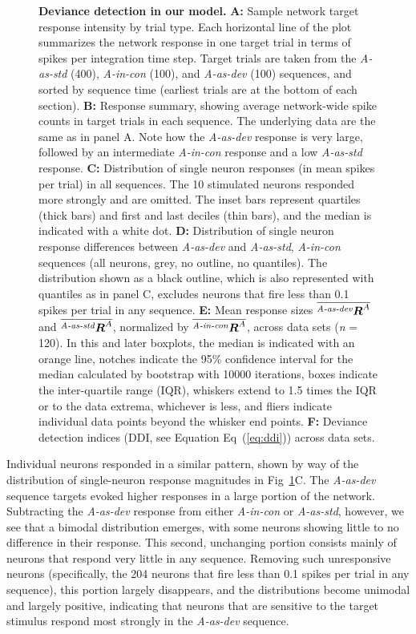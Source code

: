 \documentclass[10pt,letterpaper]{article}
\newcommand{\dev}{\textit{A-as-dev}}
\newcommand{\msc}{\textit{A-in-con}}
\newcommand{\std}{\textit{A-as-std}}
\newcommand{\ifstringequal}[4]{%
  \ifnum\pdfstrcmp{#1}{#2}=0
  #3%
  \else
  #4%
  \fi
}
\newcommand{\seqreplace}[1]{\ifstringequal{dev}{#1}{\dev}{%
    \ifstringequal{std}{#1}{\std}{%
        \ifstringequal{msc}{#1}{\msc}{#1}%
    }%
}}
\newcommand{\R}[3][]{{}^{\seqreplace{#1}}_{}\boldsymbol R^{#2}_{#3}}
\newcommand{\mean}[1]{\overline{#1}}
\newcommand{\FIG}[1]{Fig~\ref{fig:#1}}
\newcommand{\EQ}[1]{Eq~(\ref{eq:#1})}
\newcommand{\statistic}[2]{\textit{#1} = \num{#2}}
\begin{document}
\begin{figure}[!h]
    \caption{%
        \textbf{Deviance detection in our model.}
        \textbf{A:} Sample network target response intensity by trial type. Each horizontal line of the plot summarizes the network response in one target trial in terms of spikes per integration time step. Target trials are taken from the \std{} (400), \msc{} (100), and \dev{} (100) sequences, and sorted by sequence time (earliest trials are at the bottom of each section).
        \textbf{B:} Response summary, showing average network-wide spike counts in target trials in each sequence. The underlying data are the same as in panel A. Note how the \dev{} response is very large, followed by an intermediate \msc{} response and a low \std{} response.
        \textbf{C:} Distribution of single neuron responses (in mean spikes per trial) in all sequences. The 10 stimulated neurons responded more strongly and are omitted. The inset bars represent quartiles (thick bars) and first and last deciles (thin bars), and the median is indicated with a white dot.
        \textbf{D:} Distribution of single neuron response differences between \dev{} and \std{}, \msc{} sequences (all neurons, grey, no outline, no quantiles). The distribution shown as a black outline, which is also represented with quantiles as in panel C, excludes neurons that fire less than 0.1 spikes per trial in any sequence.
        \textbf{E:} Mean response sizes $\mean{\R[dev]{A}{}}$ and $\mean{\R[std]{A}{}}$, normalized by $\mean{\R[msc]{A}{}}$, across data sets (\statistic{n}{120}). In this and later boxplots, the median is indicated with an orange line, notches indicate the 95\% confidence interval for the median calculated by bootstrap with 10000 iterations, boxes indicate the inter-quartile range (IQR), whiskers extend to 1.5 times the IQR or to the data extrema, whichever is less, and fliers indicate individual data points beyond the whisker end points.
        \textbf{F:} Deviance detection indices (DDI, see Equation \EQ{ddi}) across data sets.
    }
    \label{fig:2}
\end{figure}

Individual neurons responded in a similar pattern, shown by way of the distribution of single-neuron response magnitudes in \FIG{2}C. The \dev{} sequence targets evoked higher responses in a large portion of the network. Subtracting the \dev{} response from either \msc{} or \std{}, however, we see that a bimodal distribution emerges, with some neurons showing little to no difference in their response. This second, unchanging portion consists mainly of neurons that respond very little in any sequence. Removing such unresponsive neurons (specifically, the 204 neurons that fire less than 0.1 spikes per trial in any sequence), this portion largely disappears, and the distributions become unimodal and largely positive, indicating that neurons that are sensitive to the target stimulus respond most strongly in the \dev{} sequence.
\end{document}
